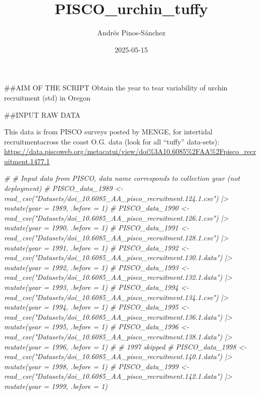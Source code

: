 \documentclass[
]{article}
\title{PISCO\_urchin\_tuffy}
\author{Andrés Pinos-Sánchez}
\date{2025-05-15}
\newenvironment{Shaded}{\begin{snugshade}}{\end{snugshade}}
\newcommand{\CommentTok}[1]{\textcolor[rgb]{0.56,0.35,0.01}{\textit{#1}}}
\begin{document}
\maketitle

\#\#AIM OF THE SCRIPT Obtain the year to tear variability of urchin
recruitment (std) in Oregon

\#\#INPUT RAW DATA

This data is from PISCO surveys posted by MENGE, for intertidal
recruitmentacross the coast O.G. data (look for all ``tuffy''
data-sets):
\url{https://data.piscoweb.org/metacatui/view/doi\%3A10.6085\%2FAA\%2Fpisco_recruitment.1477.1}

\begin{Shaded}
\begin{Highlighting}[]
\CommentTok{\# \# Input data from PISCO, data name corresponds to collection year (not deployment)}
\CommentTok{\# PISCO\_data\_1989 \textless{}{-} read\_csv("Datasets/doi\_10.6085\_AA\_pisco\_recruitment.124.1.csv")  |\textgreater{} mutate(year = 1989, .before = 1)}
\CommentTok{\# PISCO\_data\_1990 \textless{}{-} read\_csv("Datasets/doi\_10.6085\_AA\_pisco\_recruitment.126.1.csv")  |\textgreater{} mutate(year = 1990, .before = 1)}
\CommentTok{\# PISCO\_data\_1991 \textless{}{-} read\_csv("Datasets/doi\_10.6085\_AA\_pisco\_recruitment.128.1.csv")  |\textgreater{} mutate(year = 1991, .before = 1)}
\CommentTok{\# PISCO\_data\_1992 \textless{}{-} read\_csv("Datasets/doi\_10.6085\_AA\_pisco\_recruitment.130.1.data") |\textgreater{} mutate(year = 1992, .before = 1)}
\CommentTok{\# PISCO\_data\_1993 \textless{}{-} read\_csv("Datasets/doi\_10.6085\_AA\_pisco\_recruitment.132.1.data") |\textgreater{} mutate(year = 1993, .before = 1)}
\CommentTok{\# PISCO\_data\_1994 \textless{}{-} read\_csv("Datasets/doi\_10.6085\_AA\_pisco\_recruitment.134.1.csv")  |\textgreater{} mutate(year = 1994, .before = 1)}
\CommentTok{\# PISCO\_data\_1995 \textless{}{-} read\_csv("Datasets/doi\_10.6085\_AA\_pisco\_recruitment.136.1.data") |\textgreater{} mutate(year = 1995, .before = 1)}
\CommentTok{\# PISCO\_data\_1996 \textless{}{-} read\_csv("Datasets/doi\_10.6085\_AA\_pisco\_recruitment.138.1.data") |\textgreater{} mutate(year = 1996, .before = 1)}
\CommentTok{\# \# 1997 skipped}
\CommentTok{\# PISCO\_data\_1998 \textless{}{-} read\_csv("Datasets/doi\_10.6085\_AA\_pisco\_recruitment.140.1.data") |\textgreater{} mutate(year = 1998, .before = 1)}
\CommentTok{\# PISCO\_data\_1999 \textless{}{-} read\_csv("Datasets/doi\_10.6085\_AA\_pisco\_recruitment.142.1.data") |\textgreater{} mutate(year = 1999, .before = 1)}

\end{Highlighting}
\end{Shaded}
\end{document}
